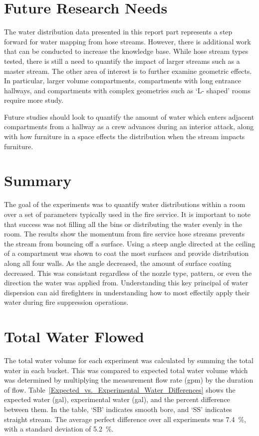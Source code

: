 \documentclass[12pt,oneside]{book}
\begin{document}
\chapter{Future Research Needs}
The water distribution data presented in this report part represents a step forward for water mapping from hose streams. However, there is additional work that can be conducted to increase the knowledge base. While hose stream types tested, there is still a need to quantify the impact of larger streams such as a master stream. The other area of interest is to further examine geometric effects. In particular, larger volume compartments, compartments with long entrance hallways, and compartments with complex geometries such as `L- shaped' rooms require more study.

Future studies should look to quantify the amount of water which enters adjacent compartments from a hallway as a crew advances during an interior attack, along with how furniture in a space effects the distribution when the stream impacts furniture. 

\chapter{Summary}
The goal of the experiments was to quantify water distributions within a room over a set of parameters typically used in the fire service. It is important to note that success was not filling all the bins or distributing the water evenly in the room. The results show the momentum from fire service hose streams prevents the stream from bouncing off a surface. Using a steep angle directed at the ceiling of a compartment was shown to coat the most surfaces and provide distribution along all four walls. As the angle decreased, the amount of surface coating decreased. This was consistant regardless of the nozzle type, pattern, or even the direction the water was applied from. Understanding this key principal of water dispersion can aid firefighters in understanding how to most effectily apply their water during fire suppression operations.  



\appendix

\chapter{Total Water Flowed}
\label{app:Water_Volume}

The total water volume for each experiment was calculated by summing the total water in each bucket. This was compared to expected total water volume which was determined by multiplying the measurement flow rate (gpm) by the duration of flow. Table~\ref{Expected_vs._Experimental_Water_Differences} shows the expected water (gal), experimental water (gal), and the percent difference between them. In the table, `SB' indicates smooth bore, and `SS' indicates straight stream. The average perfect difference over all experiments was 7.4~\%, with a standard deviation of 5.2~\%.
\end{document}
